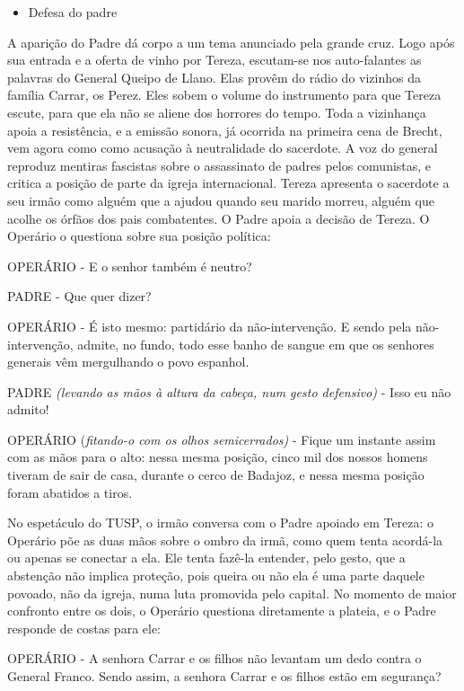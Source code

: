 \begin{itemize}
\item
  Defesa do padre
\end{itemize}

A aparição do Padre dá corpo a um tema anunciado pela grande cruz. Logo
após sua entrada e a oferta de vinho por Tereza, escutam-se nos
auto-falantes as palavras do General Queipo de Llano. Elas provêm do
rádio do vizinhos da família Carrar, os Perez. Eles sobem o volume do
instrumento para que Tereza escute, para que ela não se aliene dos
horrores do tempo. Toda a vizinhança apoia a resistência, e a emissão
sonora, já ocorrida na primeira cena de Brecht, vem agora como como
acusação à neutralidade do sacerdote. A voz do general reproduz mentiras
fascistas sobre o assassinato de padres pelos comunistas, e critica a
posição de parte da igreja internacional. Tereza apresenta o sacerdote a
seu irmão como alguém que a ajudou quando seu marido morreu, alguém que
acolhe os órfãos dos pais combatentes. O Padre apoia a decisão de
Tereza. O Operário o questiona sobre sua posição política:

OPERÁRIO - E o senhor também é neutro?

PADRE - Que quer dizer?

OPERÁRIO - É isto mesmo: partidário da não-intervenção. E sendo pela
não-intervenção, admite, no fundo, todo esse banho de sangue em que os
senhores generais vêm mergulhando o povo espanhol.

PADRE \textit{(levando as mãos à altura da cabeça, num gesto defensivo)} -
Isso eu não admito!

OPERÁRIO (\textit{fitando-o com os olhos semicerrados)} - Fique um instante
assim com as mãos para o alto: nessa mesma posição, cinco mil dos nossos
homens tiveram de sair de casa, durante o cerco de Badajoz, e nessa
mesma posição foram abatidos a tiros.

No espetáculo do TUSP, o irmão conversa com o Padre apoiado em Tereza: o
Operário põe as duas mãos sobre o ombro da irmã, como quem tenta
acordá-la ou apenas se conectar a ela. Ele tenta fazê-la entender, pelo
gesto, que a abstenção não implica proteção, pois queira ou não ela é
uma parte daquele povoado, não da igreja, numa luta promovida pelo
capital. No momento de maior confronto entre os dois, o Operário
questiona diretamente a plateia, e o Padre responde de costas para ele:

OPERÁRIO - A senhora Carrar e os filhos não levantam um dedo contra o
General Franco. Sendo assim, a senhora Carrar e os filhos estão em
segurança?


